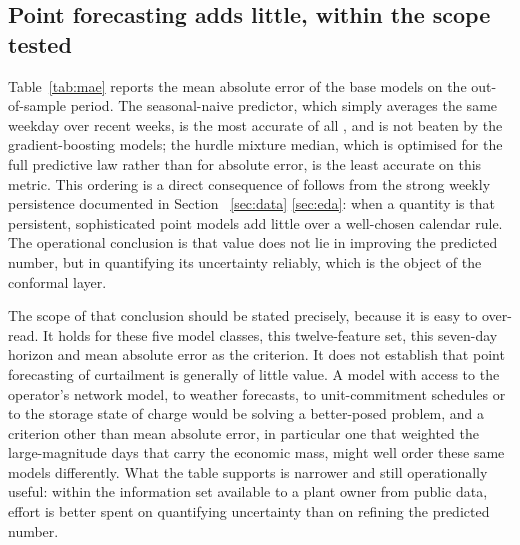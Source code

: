 \documentclass[preprint,3p,times]{elsarticle}
\providecommand{\DIFaddtex}[1]{{\protect\color{blue} \sf #1}} %
\providecommand{\DIFdeltex}[1]{{\protect\color{red} \scriptsize #1}} %
\providecommand{\DIFaddbegin}{} %
\providecommand{\DIFaddend}{} %
\providecommand{\DIFdelbegin}{} %
\providecommand{\DIFdelend}{} %
\providecommand{\DIFadd}[1]{\texorpdfstring{\DIFaddtex{#1}}{#1}} %
\providecommand{\DIFdel}[1]{\texorpdfstring{\DIFdeltex{#1}}{}} %
\begin{document}
\DIFdelbegin %
\DIFdelend \DIFaddbegin \subsection{Point forecasting adds little, within the scope tested}
\label{sec:punto}
\DIFaddend 

Table~\ref{tab:mae} reports the mean absolute error of the base models on the out-of-sample period. The seasonal-naive predictor, which \DIFdelbegin \DIFdel{simply }\DIFdelend averages the same weekday over recent weeks, is the most accurate of all \DIFdelbegin \DIFdel{, }\DIFdelend and is not beaten by the gradient-boosting models; the hurdle mixture median, which is optimised for the full predictive law rather than for absolute error, is the least accurate on this metric. This ordering \DIFdelbegin \DIFdel{is a direct consequence of }\DIFdelend \DIFaddbegin \DIFadd{follows from }\DIFaddend the strong weekly persistence documented in Section~\DIFdelbegin \DIFdel{\ref{sec:data}}\DIFdelend \DIFaddbegin \DIFadd{\ref{sec:eda}}\DIFaddend : when a quantity is that persistent, sophisticated point models add little over a well-chosen calendar rule.
\DIFdelbegin \DIFdel{The operational conclusion is that value does not lie in improving the predicted number, but in quantifying its uncertainty reliably, which is the object of the conformal layer. }\DIFdelend \DIFaddbegin 

\DIFadd{The scope of that conclusion should be stated precisely, because it is easy to over-read. It holds for these five model classes, this twelve-feature set, this seven-day horizon and mean absolute error as the criterion. It does not establish that point forecasting of curtailment is generally of little value. A model with access to the operator's network model, to weather forecasts, to unit-commitment schedules or to the storage state of charge would be solving a better-posed problem, and a criterion other than mean absolute error, in particular one that weighted the large-magnitude days that carry the economic mass, might well order these same models differently. What the table supports is narrower and still operationally useful: within the information set available to a plant owner from public data, effort is better spent on quantifying uncertainty than on refining the predicted number.
}\DIFaddend 
\end{document}
